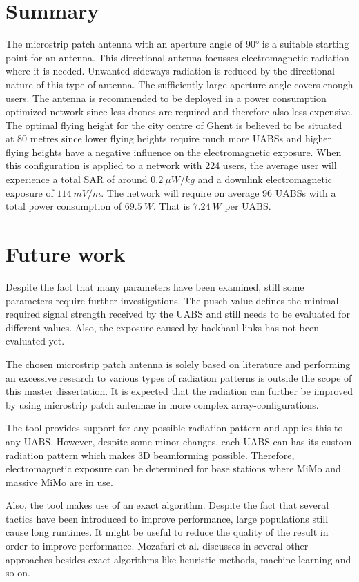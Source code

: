 \section{Summary}
The microstrip patch antenna with an aperture angle of \ang{90} is a suitable starting point for an antenna. 
This directional antenna focusses electromagnetic radiation where it is needed. Unwanted sideways radiation 
is reduced by the directional nature of this type of antenna.
The sufficiently large aperture angle covers enough users. The antenna is recommended to be deployed in a power consumption 
optimized network since less drones are required and therefore also less expensive.
The optimal flying height for the city centre of Ghent is believed to be situated at 80 metres since lower flying heights require much more \gls{UABS}s and
higher flying heights have a negative influence on the electromagnetic exposure.  
When this configuration is applied to a network with 224 users, the average user will 
experience a total SAR of around $0.2\ \mu W/kg$ and
 a downlink electromagnetic exposure of $114\ mV/m$. The network will require on average 96 UABSs with a total
power consumption of $69.5\ W$. That is $7.24\ W$ per UABS.

\section{Future work}

Despite the fact that many parameters have been examined, still some parameters require further investigations.
The \gls{pusch} value defines the minimal required signal strength received by the \gls{UABS} and still needs to be evaluated
for different values. Also, the exposure caused by backhaul links has not been evaluated yet.

The chosen microstrip patch antenna is solely based on literature and performing an excessive research to various 
types of radiation patterns is outside the scope of this master dissertation. It is expected that the radiation can 
further be improved by using microstrip patch antennae in more complex array-configurations. 

The tool provides support for any possible radiation pattern and applies this to any \gls{UABS}.
However, despite some minor changes, each \gls{UABS} can has its custom radiation pattern which makes 
3D beamforming possible. Therefore, electromagnetic exposure can be determined for base stations where MiMo
and massive MiMo are in use.

Also, the tool makes use of an \gls{exact algorithm}. Despite the fact that several  
tactics have been introduced to improve performance, large populations still cause long runtimes. It might be useful 
to reduce the quality of the result in order to improve performance. Mozafari et al. discusses in \cite{U3} several 
other approaches besides \gls{exact algorithm}s like heuristic methods, machine learning and so on.